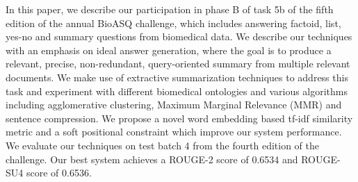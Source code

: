 In this paper, we describe our participation in phase B of task 5b of the fifth edition of the annual BioASQ challenge, which includes answering factoid, list, yes-no and summary questions from biomedical data. We describe our techniques with an emphasis on ideal answer generation, where the goal is to produce a relevant, precise, non-redundant, query-oriented summary from multiple relevant documents. We make use of extractive summarization techniques to address this task and experiment with different biomedical ontologies and various algorithms including agglomerative clustering, Maximum Marginal Relevance (MMR) and sentence compression. We propose a novel word embedding based tf-idf similarity metric and a soft positional constraint which improve our system performance. We evaluate our techniques on test batch 4 from the fourth edition of the challenge. Our best system achieves a ROUGE-2 score of 0.6534 and ROUGE-SU4 score of 0.6536.
